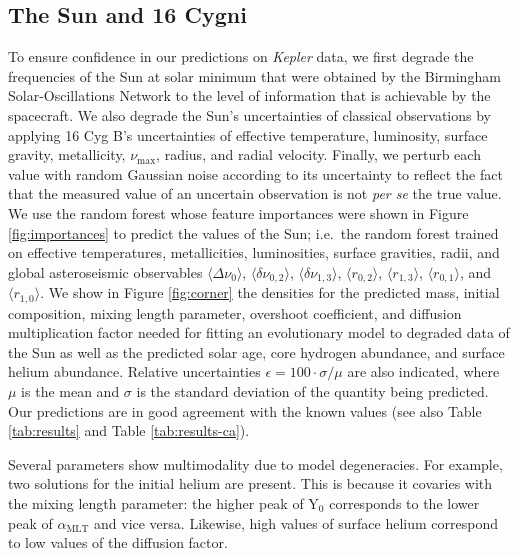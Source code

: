 \documentclass[twocolumn,twocolappendix]{aastex6}
\begin{document}
\subsection{The Sun and 16 Cygni}
To ensure confidence in our predictions on \emph{Kepler} data, we first degrade the frequencies of the Sun at solar minimum that were obtained by the Birmingham Solar-Oscillations Network \citep[BiSON;][]{2014MNRAS.439.2025D} to the level of information that is achievable by the spacecraft. We also degrade the Sun's uncertainties of classical observations by applying 16 Cyg B's uncertainties of effective temperature, luminosity, surface gravity, metallicity, $\nu_{\max}$, radius, and radial velocity. Finally, we perturb each value with random Gaussian noise according to its uncertainty to reflect the fact that the measured value of an uncertain observation is not \emph{per se} the true value. We use the random forest whose feature importances were shown in Figure \ref{fig:importances} to predict the values of the Sun; i.e.\ the random forest trained on effective temperatures, metallicities, luminosities, surface gravities, radii, and global asteroseismic observables $\langle \Delta\nu_0 \rangle$, $\langle \delta\nu_{0,2} \rangle$, $\langle \delta\nu_{1,3} \rangle$, $\langle r_{0,2} \rangle$, $\langle r_{1,3} \rangle$, $\langle r_{0,1} \rangle$, and $\langle r_{1,0} \rangle$. We show in Figure \ref{fig:corner} the densities for the predicted mass, initial composition, mixing length parameter, overshoot coefficient, and diffusion multiplication factor needed for fitting an evolutionary model to degraded data of the Sun as well as the predicted solar age, core hydrogen abundance, and surface helium abundance. Relative uncertainties $\epsilon=100\cdot\sigma/\mu$ are also indicated, where $\mu$ is the mean and $\sigma$ is the standard deviation of the quantity being predicted. Our predictions are in good agreement with the known values (see also Table \ref{tab:results} and Table \ref{tab:results-ca}). 

Several parameters show multimodality due to model degeneracies. For example, two solutions for the initial helium are present. This is because it covaries with the mixing length parameter: the higher peak of Y$_0$ corresponds to the lower peak of $\alpha_{\text{MLT}}$ and vice versa. Likewise, high values of surface helium correspond to low values of the diffusion factor. 
\end{document}
